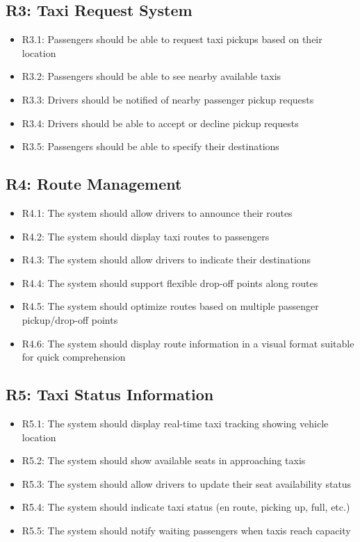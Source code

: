 \documentclass[a4paper,12pt]{article}
\begin{document}
\subsection*{R3: Taxi Request System}
\begin{itemize}
    \item R3.1: Passengers should be able to request taxi pickups based on their location
    \item R3.2: Passengers should be able to see nearby available taxis
    \item R3.3: Drivers should be notified of nearby passenger pickup requests
    \item R3.4: Drivers should be able to accept or decline pickup requests
    \item R3.5: Passengers should be able to specify their destinations
\end{itemize}

\subsection*{R4: Route Management}
\begin{itemize}
    \item R4.1: The system should allow drivers to announce their routes
    \item R4.2: The system should display taxi routes to passengers
    \item R4.3: The system should allow drivers to indicate their destinations
    \item R4.4: The system should support flexible drop-off points along routes
    \item R4.5: The system should optimize routes based on multiple passenger pickup/drop-off points
    \item R4.6: The system should display route information in a visual format suitable for quick comprehension
\end{itemize}

\subsection*{R5: Taxi Status Information}
\begin{itemize}
    \item R5.1: The system should display real-time taxi tracking showing vehicle location
    \item R5.2: The system should show available seats in approaching taxis
    \item R5.3: The system should allow drivers to update their seat availability status
    \item R5.4: The system should indicate taxi status (en route, picking up, full, etc.)
    \item R5.5: The system should notify waiting passengers when taxis reach capacity
\end{itemize}
\end{document}
